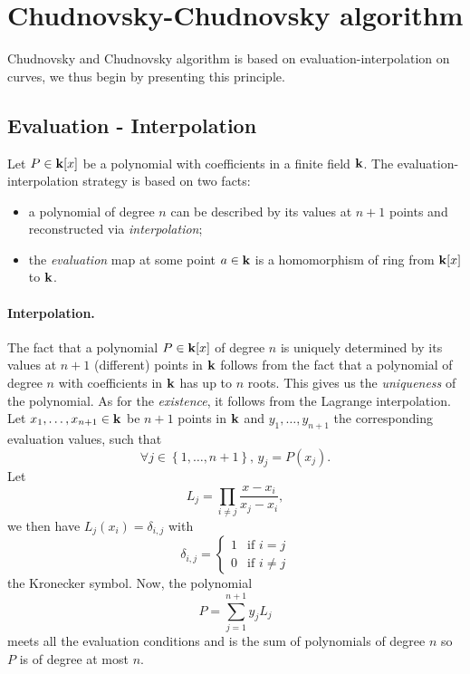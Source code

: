 %
%
%


\section{Chudnovsky-Chudnovsky algorithm}
Chudnovsky and Chudnovsky algorithm is based on evaluation-interpolation on
curves, we thus begin by presenting this principle.
\subsection{Evaluation - Interpolation}
\label{sec:evalinter}

Let $P\in\mathbf{k}[x]$ be a polynomial with coefficients in a finite field $\mathbf{k}$. The
evaluation-interpolation strategy is based on two facts:
\begin{itemize}
  \item a polynomial of degree $n$ can be described by its values at $n+1$
    points and reconstructed via \emph{interpolation};
  \item the \emph{evaluation} map at some point $a\in\mathbf{k}$ is a homomorphism of ring from
    $\mathbf{k}[x]$ to $\mathbf{k}$.
\end{itemize}
\paragraph{Interpolation.} The fact that a polynomial $P\in\mathbf{k}[x]$ of degree $n$
is uniquely determined by its values at $n+1$ (different) points in $\mathbf{k}$ follows
from the fact that a polynomial of degree $n$ with coefficients in $\mathbf{k}$ has up
to $n$ roots. This gives us the \emph{uniqueness} of the polynomial. As for the
\emph{existence}, it follows from the Lagrange interpolation. Let $x_1, \dots,
x_{n+1}\in\mathbf{k}$ be $n+1$ points in $\mathbf{k}$ and $y_1, \dots, y_{n+1}$ the
corresponding evaluation values, such that
\[
  \forall j\in\left\{ 1, \dots, n+1 \right\},\,y_j = P(x_j).
\]
Let 
\[
  L_j = \prod_{i\neq j}\frac{x-x_i}{x_j-x_i},
\]
we then have $L_j(x_i) = \delta_{i, j}$ with
\[
  \delta_{i, j} = 
  \left\{\begin{array}{ll}
      1&\mbox{if } i=j\\
      0&\mbox{if } i\neq j
    \end{array}
    \right.
\]
the Kronecker symbol. Now, the polynomial
\[
  P = \sum_{j=1}^{n+1} y_j L_j
\]
meets all the evaluation conditions and is the sum of polynomials of degree $n$
so $P$ is of degree at most $n$.

